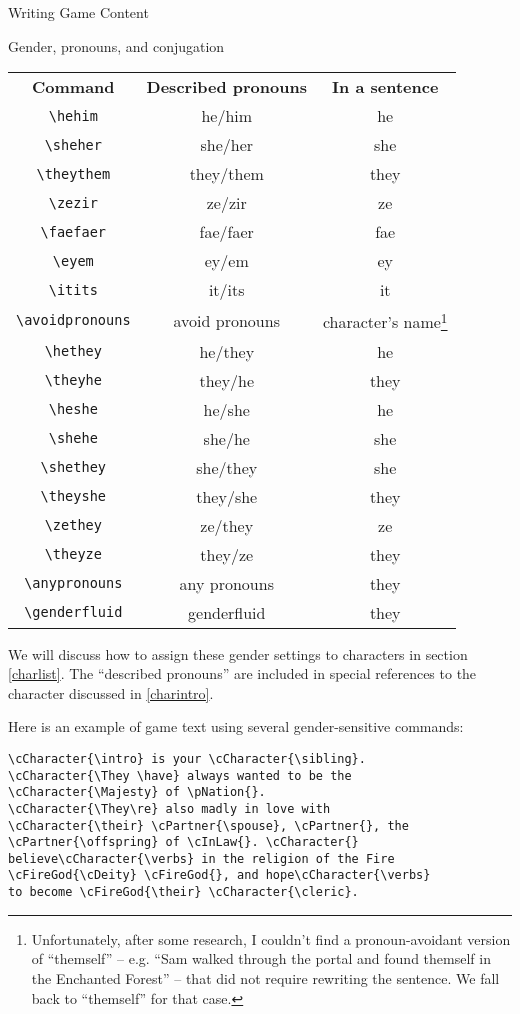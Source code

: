 \documentclass[sheet]{GameTexBase}
\begin{document}
\begin{section}{Writing Game Content}
\begin{subsection}{Gender, pronouns, and conjugation}
\begin{center}
\begin{tabular}{c|c|c}
\textbf{Command} & \textbf{Described pronouns} & \textbf{In a sentence} \\
\lstinline|\hehim| & he/him & he \\
\lstinline|\sheher| & she/her & she \\
\lstinline|\theythem| & they/them & they \\
\lstinline|\zezir| & ze/zir & ze \\
\lstinline|\faefaer| & fae/faer & fae \\
\lstinline|\eyem| & ey/em & ey \\
\lstinline|\itits| & it/its & it \\
\lstinline|\avoidpronouns| & avoid pronouns & character's name\footnote{Unfortunately, after some research, I couldn't find a pronoun-avoidant version of ``themself'' -- e.g. ``Sam walked through the portal and found themself in the Enchanted Forest'' -- that did not require rewriting the sentence.  We fall back to ``themself'' for that case.} \\
\lstinline|\hethey| & he/they & he \\
\lstinline|\theyhe| & they/he & they \\
\lstinline|\heshe| & he/she & he \\
\lstinline|\shehe| & she/he & she \\
\lstinline|\shethey| & she/they & she \\
\lstinline|\theyshe| & they/she & they \\
\lstinline|\zethey| & ze/they & ze \\
\lstinline|\theyze| & they/ze & they \\
\lstinline|\anypronouns| & any pronouns & they \\
\lstinline|\genderfluid| & genderfluid & they
\end{tabular}
\end{center}

We will discuss how to assign these gender settings to characters in section \ref{charlist}.  The ``described pronouns'' are included in special references to the character discussed in \ref{charintro}.

Here is an example of game text using several gender-sensitive commands:

\begin{verbatim}
\cCharacter{\intro} is your \cCharacter{\sibling}.
\cCharacter{\They \have} always wanted to be the
\cCharacter{\Majesty} of \pNation{}.  
\cCharacter{\They\re} also madly in love with 
\cCharacter{\their} \cPartner{\spouse}, \cPartner{}, the 
\cPartner{\offspring} of \cInLaw{}. \cCharacter{} 
believe\cCharacter{\verbs} in the religion of the Fire
\cFireGod{\cDeity} \cFireGod{}, and hope\cCharacter{\verbs}
to become \cFireGod{\their} \cCharacter{\cleric}.
\end{verbatim} 


\end{subsection}
\end{section}
\end{document}
